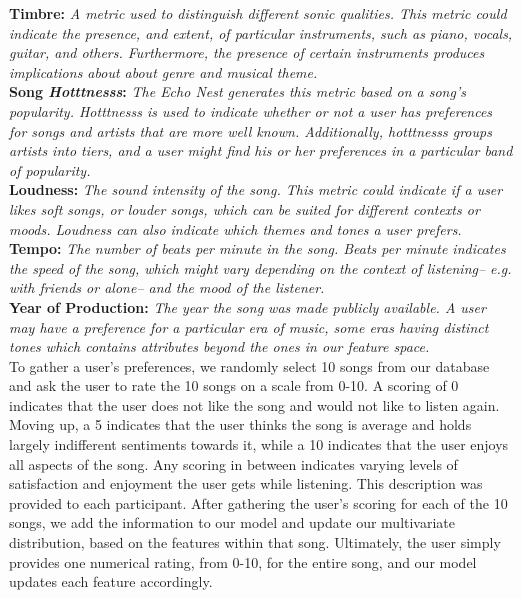 \documentclass{amsart}
\theoremstyle{plain}
\theoremstyle{definition}
\begin{document}
  	\noindent \textbf{Timbre: }\textit{A metric used to distinguish different sonic qualities. This metric could indicate the presence, and extent, of particular instruments, such as piano, vocals, guitar, and others. Furthermore, the presence of certain instruments produces implications about about genre and musical theme.} \\
  	
  	\noindent \textbf{Song \textit{Hotttnesss}: }\textit{The Echo Nest generates this metric based on a song's popularity. Hotttnesss is used to indicate whether or not a user has preferences for songs and artists that are more well known. Additionally, hotttnesss groups artists into tiers, and a user might find his or her preferences in a particular band of popularity.} \\
  	
  	\noindent \textbf{Loudness: }\textit{The sound intensity of the song. This metric could indicate if a user likes soft songs, or louder songs, which can be suited for different contexts or moods. Loudness can also indicate which themes and tones a user prefers.} \\
  	
  	\noindent \textbf{Tempo: }\textit{The number of beats per minute in the song. Beats per minute indicates the speed of the song, which might vary depending on the context of listening-- e.g. with friends or alone-- and the mood of the listener.} \\
  	
  	\noindent \textbf{Year of Production: }\textit{The year the song was made publicly available. A user may have a preference for a particular era of music, some eras having distinct tones which contains attributes beyond the ones in our feature space.} \\
  	
  	To gather a user's preferences, we randomly select 10 songs from our database and ask the user to rate the 10 songs on a scale from 0-10. A scoring of 0 indicates that the user does not like the song and would not like to listen again. Moving up, a 5 indicates that the user thinks the song is average and holds largely indifferent sentiments towards it, while a 10 indicates that the user enjoys all aspects of the song. Any scoring in between indicates varying levels of satisfaction and enjoyment the user gets while listening. This description was provided to each participant. After gathering the user's scoring for each of the 10 songs, we add the information to our model and update our multivariate distribution, based on the features within that song. Ultimately, the user simply provides one numerical rating, from 0-10, for the entire song, and our model updates each feature accordingly. 
  	
\end{document}

